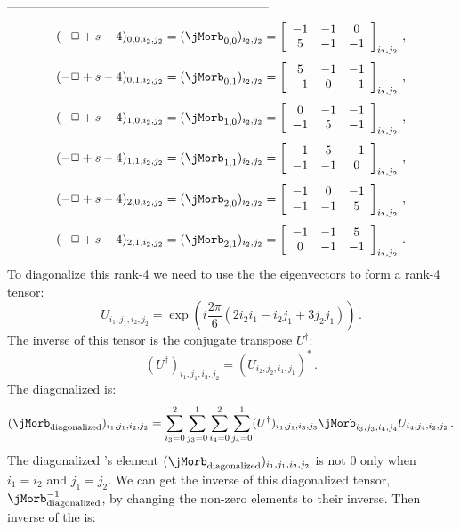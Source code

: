 \begin{description}
{---------------------------------------------------------------
\[
(- \Box +s -4)_{0,0,i_2, j_2} = (\jMorb_{0,0})_{i_2, j_2} =
 \left[
 \begin{array}{ccc}
 -1 & -1 & 0 \\
 5 & -1 & -1
 \end{array}
 \right]_{i_2, j_2} \, ,
\]
\[
 (- \Box +s -4)_{0,1,i_2, j_2} = (\jMorb_{0,1})_{i_2, j_2} =
 \left[
 \begin{array}{ccc}
 5 & -1 & -1 \\
 -1 & 0 & -1
 \end{array}
 \right]_{i_2, j_2} \, ,
\]
\[
 (- \Box +s -4)_{1,0,i_2, j_2} = (\jMorb_{1,0})_{i_2, j_2} =
 \left[
 \begin{array}{ccc}
 0 & -1 & -1 \\
 -1 & 5 & -1
 \end{array}
 \right]_{i_2, j_2} \, ,
\]
\[
 (- \Box +s -4)_{1,1,i_2, j_2} = (\jMorb_{1,1})_{i_2, j_2} =
 \left[
 \begin{array}{ccc}
 -1 & 5 & -1 \\
 -1 & -1 & 0
 \end{array}
 \right]_{i_2, j_2} \, ,
\]
\[
 (- \Box +s -4)_{2,0,i_2, j_2} = (\jMorb_{2,0})_{i_2, j_2} =
 \left[
 \begin{array}{ccc}
 -1 & 0 & -1 \\
 -1 & -1 & 5
 \end{array}
 \right]_{i_2, j_2} \, ,
\]
\[
 (- \Box +s -4)_{2,1,i_2, j_2} = (\jMorb_{2,1})_{i_2, j_2} =
 \left[
 \begin{array}{ccc}
 -1 & -1 & 5 \\
 0 & -1 & -1
 \end{array}
 \right]_{i_2, j_2} \, .
\]
To diagonalize this rank-4 {\jacobianOrb} we need to use the the eigenvectors  to form a rank-4 tensor:
\[
U_{i_1,j_1,i_2,j_2}=
\exp\left(
      i\frac{2 \pi}{6}(2 i_2 i_1 - i_2 j_1 + 3 j_2 j_1)
        \right) \, .
\]
The inverse of this tensor is the conjugate transpose $U^\dagger$:
\[
(U^\dagger)_{i_1,j_1,i_2,j_2} = (U_{i_2,j_2,i_1,j_1})^* \, .
\]
The diagonalized {\jacobianOrb} is:
\[
(\jMorb_{\mathrm{diagonalized}})_{i_1,j_1,i_2,j_2}
= \sum_{i_3=0}^2 \sum_{j_3=0}^1 \sum_{i_4=0}^2 \sum_{j_4=0}^1 (U^\dagger)_{i_1,j_1,i_3,j_3} \jMorb_{i_3,j_3,i_4,j_4} U_{i_4,j_4,i_2,j_2} \, .
\]
The diagonalized {\jacobianOrb}'s element $(\jMorb_{\mathrm{diagonalized}})_{i_1,j_1,i_2,j_2}$ is not 0 only when $i_1 = i_2$ and $j_1 = j_2$. We can get the inverse of this diagonalized tensor, $\jMorb_{\mathrm{diagonalized}}^{-1}$, by changing the non-zero elements to their inverse. Then inverse of the {\jacobianOrb} is:
}
\end{description}
